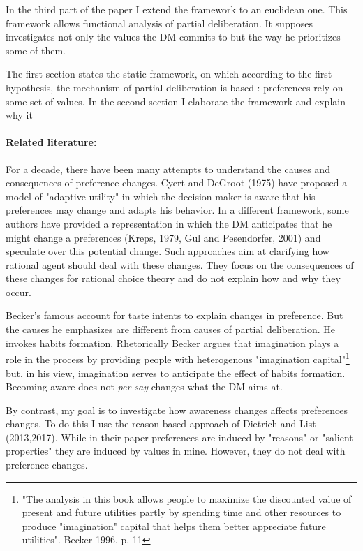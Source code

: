 \documentclass[11pt]{article}
\begin{document}
In the third part of the paper I extend the framework to an euclidean one.  This framework allows functional analysis of partial deliberation. It supposes investigates not only the values the DM commits to but the way he prioritizes some of them. 


The first section states the static framework, on which according to the first hypothesis, the mechanism of partial deliberation is based  : preferences rely on some set of values. In the second section I elaborate the framework and explain why it 
\paragraph{Related literature:}

For a decade, there have been many attempts to understand the causes and consequences of preference changes. Cyert and DeGroot (1975) have proposed a model of "adaptive utility" in which the decision maker is aware that his preferences may change and adapts his behavior. In a different framework, some authors have provided a representation in which the DM anticipates that he might change a preferences (Kreps, 1979, Gul and Pesendorfer, 2001) and speculate over this potential change. Such approaches aim at clarifying how rational agent should deal with these changes. They focus on the consequences of these changes for rational choice theory and do not explain how and why they occur.


Becker's famous account for taste intents to explain changes in preference. But the causes he emphasizes are different from causes of partial deliberation. He invokes habits formation. Rhetorically Becker argues that imagination plays a role in the process by providing people with heterogenous "imagination capital"\footnote{"The analysis in this book allows people
to maximize the discounted value of present and future utilities partly
by spending time and other resources to produce "imagination" capital
that helps them better appreciate future utilities". Becker 1996, p. 11 } but, in his view, imagination serves to anticipate the effect of habits formation. Becoming aware does not \textit{per say }changes what the DM aims at.   

By contrast, my goal is to investigate how awareness changes affects preferences changes. To do this I use the reason based approach of Dietrich and List (2013,2017). While in their paper preferences are induced by "reasons" or "salient properties" they are induced by values in mine.  However, they do not deal with preference changes.
\end{document}
